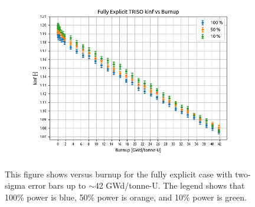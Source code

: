 \documentclass[letterpaper]{physor2024}
\begin{document}
\begin{figure}[!h]
    \centering
    \begin{subfigure}{0.7\linewidth}
        \centering
        \includegraphics[width=\linewidth]{figures/expl_kinf_vs_bu.png}
    \end{subfigure}
    \caption{This figure shows \kinf versus burnup for the fully explicit case with two-sigma error bars up to $\sim$42 GWd/tonne-U. The legend shows that 100\% power is blue, 50\% power is orange, and 10\% power is green. }
    \label{fig:kinf_full_explicit_results}
\end{figure}
\end{document}
